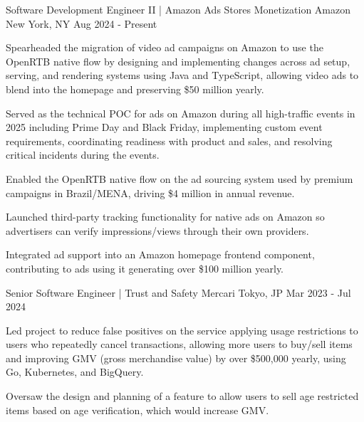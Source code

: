 

\begin{cventries}

    \cventry
    {Software Development Engineer II | Amazon Ads Stores Monetization } %
    {Amazon} %
    {New York, NY} %
    {Aug 2024 - Present} %
    {
        \begin{cvitems} %
            \item {Spearheaded the migration of video ad campaigns on Amazon to use the OpenRTB native flow by designing and implementing changes across ad setup, serving, and rendering systems using Java and TypeScript, allowing video ads to blend into the homepage and preserving \$50 million yearly.}
            \item {Served as the technical POC for ads on Amazon during all high-traffic events in 2025 including Prime Day and Black Friday, implementing custom event requirements, coordinating readiness with product and sales, and resolving critical incidents during the events.}
            \item {Enabled the OpenRTB native flow on the ad sourcing system used by premium campaigns in Brazil/MENA, driving \$4 million in annual revenue.}
            \item {Launched third-party tracking functionality for native ads on Amazon so advertisers can verify impressions/views through their own providers.}
            \item {Integrated ad support into an Amazon homepage frontend component, contributing to ads using it generating over \$100 million yearly.}
        \end{cvitems}
    }

    \cventry
    {Senior Software Engineer | Trust and Safety} %
    {Mercari} %
    {Tokyo, JP} %
    {Mar 2023 - Jul 2024} %
    {
        \begin{cvitems} %
            \item {Led project to reduce false positives on the service applying usage restrictions to users who repeatedly cancel transactions, allowing more users to buy/sell items and improving GMV (gross merchandise value) by over \$500,000 yearly, using Go, Kubernetes, and BigQuery.}
            \item {Oversaw the design and planning of a feature to allow users to sell age restricted items based on age verification, which would increase GMV.}
        \end{cvitems}
    }


\end{cventries}
